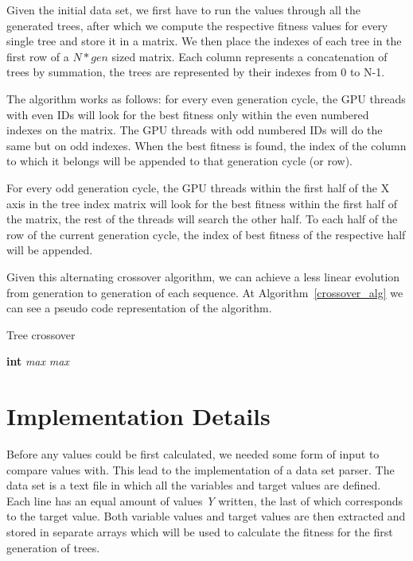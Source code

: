 \documentclass[runningheads]{llncs}
\begin{document}
Given the initial data set, we first have to run the values through all the generated trees, after which we compute the respective fitness values for every single tree and store it in a matrix. We then place the indexes of each tree in the first row of a $N * gen$ sized matrix. Each column represents a concatenation of trees by summation, the trees are represented by their indexes from 0 to N-1.

The algorithm works as follows: for every even generation cycle, the GPU threads with even IDs will look for the best fitness only within the even numbered indexes on the matrix. The GPU threads with odd numbered IDs will do the same but on odd indexes. When the best fitness is found, the index of the column to which it belongs will be appended to that generation cycle (or row).

For every odd generation cycle, the GPU threads within the first half of the X axis in the tree index matrix will look for the best fitness within the first half of the matrix, the rest of the threads will search the other half. To each half of the row of the current generation cycle, the index of best fitness of the respective half will be appended.

Given this alternating crossover algorithm, we can achieve a less linear evolution from generation to generation of each sequence. At Algorithm~\ref{crossover_alg} we can see a pseudo code representation of the algorithm.

\begin{algorithm}
\caption{Tree crossover}
\begin{algorithmic}[1]
\State \textbf{int} \textit{max}
	\EndFor
\Else {}
	\EndFor
\Else
	\EndFor
\EndIf
\EndIf
\State \Return \textit{max}
\EndProcedure
\end{algorithmic}
\label{crossover_alg}
\end{algorithm}


\section{Implementation Details}
Before any values could be first calculated, we needed some form of input to compare values with. This lead to the implementation of a data set parser. The data set is a text file in which all the variables and target values are defined. Each line has an equal amount of values \textit{Y} written, the last of which corresponds to the target value. Both variable values and target values are then extracted and stored in separate arrays which will be used to calculate the fitness for the first generation of trees.
\end{document}
